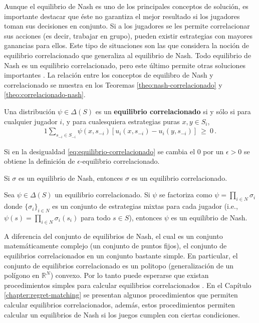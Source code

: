 Aunque el equilibrio de Nash es uno de los principales conceptos de solución, es importante destacar que éste no garantiza el mejor resultado si los jugadores toman sus decisiones en conjunto. Si a los jugadores se les permite correlacionar sus acciones (es decir, trabajar en grupo), pueden existir estrategias con mayores ganancias para ellos. 
Este tipo de situaciones son las que considera la noción de equilibrio correlacionado que generaliza al equilibrio de Nash. Todo equilibrio de Nash es un equilibrio correlacionado, pero este último permite otras soluciones importantes \cite{bib:correlated-equilibrium}. La relación entre los conceptos de equilibro de Nash y correlacionado se muestra en los Teoremas \ref{theo:nash-correlacionado} y \ref{theo:correlacionado-nash}.

\begin{definition}
\label{def:equilibrio-correlacionado}
Una distribución $\psi\in\Delta(S)$ es un \textbf{equilibrio correlacionado} si y sólo si para cualquier jugador $i$, y para cualesquiera estrategias puras $x, y \in S_i$,
\begin{alignat}{1}
\label{eq:equilibrio-correlacionado}
\sum_{s_{-i}\in S_{-i}} \psi(x,s_{-i}) [ u_i(x,s_{-i}) - u_i(y,s_{-i})]\ \geq\ 0 \,.
\end{alignat}
\end{definition}

Si en la desigualdad \eqref{eq:equilibrio-correlacionado} se cambia el $0$ por un $\epsilon > 0$ se obtiene la definición de $\epsilon$-equilibrio correlacionado.


\begin{theorem}
\label{theo:nash-correlacionado}
Si $\sigma$ es un equilibrio de Nash, entonces $\sigma$ es un equilibrio correlacionado.
\end{theorem}

\begin{theorem}
\label{theo:correlacionado-nash}
Sea $\psi\in\Delta(S)$ un equilibrio correlacionado. Si $\psi$ se factoriza como $\psi=\prod_{i\in N} \sigma_i$ donde $\{\sigma_i\}_{i\in N}$ es un conjunto de estrategias mixtas para cada jugador (i.e., $\psi(s)=\prod_{i \in N} \sigma_i(s_i)$ para todo $s\in S$), entonces $\psi$ es un equilibrio de Nash.
\end{theorem}

A diferencia del conjunto de equilibrios de Nash, el cual es un conjunto matemáticamente complejo (un conjunto de puntos fijos), el conjunto de equilibrios correlacionados en un conjunto bastante simple. En particular, el conjunto de equilibrios correlacionado es un politopo (generalización de un polígono en $\mathbb{R}^N$) convexo. Por lo tanto puede esperarse que existan procedimientos simples para calcular equilibrios correlacionados  \cite{bib:correlated-equilibrium}. En el Capítulo \ref{chapter:regret-matching} se presentan algunos procedimientos que permiten calcular equilibrios correlacionados, además, estos procedimientos permiten calcular un equilibrios de Nash si los juegos cumplen con ciertas condiciones.


